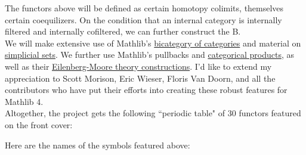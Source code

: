 \documentclass{book}
\theoremstyle{definition}
\begin{document}
The functors above will be defined as certain homotopy colimits, themselves certain coequilizers. On the condition that an internal category is internally filtered and internally cofiltered, we can further construct the B⃗.\\

We will make extensive use of Mathlib's \href{https://leanprover-community.github.io/mathlib4_docs/Mathlib/CategoryTheory/Category/Cat.html#CategoryTheory.Cat.bicategory}{bicategory of categories} and material on \href{https://github.com/leanprover-community/mathlib4/blob/bd3e369b6f82c874de0f318c71d7e0595f8a3aa4//Mathlib/AlgebraicTopology/SimplicialSet.lean#L47-L48}{simplicial sets}. We further use Mathlib's pullbacks and \href{https://github.com/leanprover-community/mathlib4/blob/bd3e369b6f82c874de0f318c71d7e0595f8a3aa4/Mathlib/CategoryTheory/Products/Basic.lean}{categorical products}, as well as their \href{https://github.com/leanprover-community/mathlib4/blob/bd3e369b6f82c874de0f318c71d7e0595f8a3aa4/Mathlib/CategoryTheory/Monad/Algebra.lean}{Eilenberg-Moore theory constructions}. I'd like to extend my appreciation to Scott Morison, Eric Wieser, Floris Van Doorn, and all the contributors who have put their efforts into creating these robust features for Mathlib 4.\\

Altogether, the project gets the following ``periodic table" of 30 functors featured on the front cover:\\

{\footnotesize
\begin{center}
\end{center}}

Here are the names of the symbols featured above:
\end{document}
